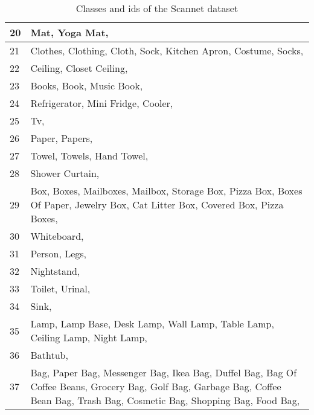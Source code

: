 \begin{table}
\begin{center}
\begin{tabular}{ | l | p{17cm} |}
    		20 & Mat, Yoga Mat, \\ \hline
    		21 & Clothes, Clothing, Cloth, Sock, Kitchen Apron, Costume, Socks, \\ \hline
    		22 & Ceiling, Closet Ceiling, \\ \hline
    		23 & Books, Book, Music Book, \\ \hline
    		24 & Refrigerator, Mini Fridge, Cooler, \\ \hline
    		25 & Tv, \\ \hline
    		26 & Paper, Papers, \\ \hline
    		27 & Towel, Towels, Hand Towel, \\ \hline
    		28 & Shower Curtain, \\ \hline
    		29 & Box, Boxes, Mailboxes, Mailbox, Storage Box, Pizza Box, Boxes Of Paper, Jewelry Box, Cat Litter Box, Covered Box, Pizza Boxes, \\ \hline
    		30 & Whiteboard, \\ \hline
    		31 & Person, Legs, \\ \hline
    		32 & Nightstand, \\ \hline
    		33 & Toilet, Urinal, \\ \hline
    		34 & Sink, \\ \hline
    		35 & Lamp, Lamp Base, Desk Lamp, Wall Lamp, Table Lamp, Ceiling Lamp, Night Lamp, \\ \hline
    		36 & Bathtub, \\ \hline
    		37 & Bag, Paper Bag, Messenger Bag, Ikea Bag, Duffel Bag, Bag Of Coffee Beans, Grocery Bag, Golf Bag, Garbage Bag, Coffee Bean Bag, Trash Bag, Cosmetic Bag, Shopping Bag, Food Bag, \\ \hline
    		
    		\hline
    	\end{tabular}
    	\caption{Classes and ids of the Scannet dataset}
    	\label{table:Classes in scannet_1}
    
    \end{center}
	\end{table}
	
